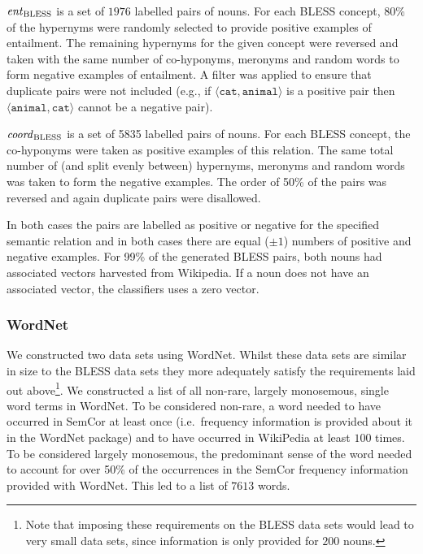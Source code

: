 \documentclass[11pt]{article}
\newcommand\entBLESS{\mbox{\em ent\/}_{\mbox{\scriptsize BLESS}}}
\newcommand\coordBLESS{\mbox{\em coord\/}_{\mbox{\scriptsize BLESS}}}
\begin{document}
\smallskip

\noindent $\entBLESS$ is a set of $1976$ labelled pairs of nouns.  For each BLESS concept, 80\% of the hypernyms were randomly selected to provide positive examples of entailment.  The remaining hypernyms for the given concept were reversed and taken with the same number of co-hyponyms, meronyms and random words to form negative examples of entailment.  A filter was applied to ensure that duplicate pairs were not included (e.g., if $\langle\texttt{cat},\texttt{animal}\rangle$ is a positive pair then $\langle\texttt{animal},\texttt{cat}\rangle$ cannot be a negative pair). 

\smallskip

\noindent $\coordBLESS$ is a set of 5835 labelled pairs of nouns.  For each BLESS concept, the co-hyponyms were taken as positive examples of this relation.  The same total number of (and split evenly between) hypernyms, meronyms and random words was taken to form the negative examples.  The order of 50\% of the pairs was reversed and again duplicate pairs were disallowed. 

\smallskip

In both cases the pairs are labelled as positive or negative for the specified semantic relation and in both cases there are equal ($\pm 1$) numbers of positive and negative examples.  For 99\% of the generated BLESS pairs, both nouns had associated vectors harvested from Wikipedia.  If a noun does not have an associated vector, the classifiers uses a zero vector.  

\subsubsection{WordNet}

We  constructed two data sets using WordNet.  Whilst these data sets are similar in size to the BLESS data sets they more adequately satisfy the requirements laid out above\footnote{Note that imposing these requirements on the BLESS data sets would lead to very small data sets, since information is only provided for $200$ nouns.}.  We constructed a list of all non-rare, largely monosemous, single word terms in WordNet.  To be considered non-rare, a word needed to have occurred in SemCor at least once (i.e.~frequency information is provided about it in the WordNet package) and to have occurred in WikiPedia at least $100$ times.  To be considered largely monosemous, the predominant sense of the word needed to account for over 50\% of the occurrences in the SemCor frequency information provided with WordNet.  This led to a list of $7613$ words. 
\end{document}
